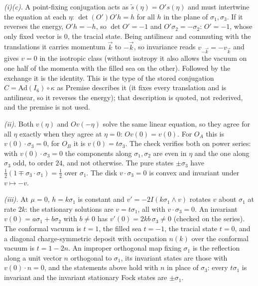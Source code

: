 \emph{(i)(c).} A point-fixing conjugation acts as $\tilde s(\eta) = O's(\eta)$ and must intertwine the equation at each $\eta$: $\det(O')O'h = h$ for all $h$ in the plane of $\sigma_{1}, \sigma_{3}$. If it reverses the energy, $O'h = -h$, so $\det O' = -1$ and $O'\sigma_{2} = -\sigma_{2}$: $O' = -1$, whose only fixed vector is $0$, the tracial state. Being antilinear and commuting with the translations it carries momentum $\vec k$ to $-\vec k$, so invariance reads $v_{-\vec k} = -v_{\vec k}$ and gives $v = 0$ in the isotropic class (without isotropy it also allows the vacuum on one half of the momenta with the filled sea on the other). Followed by the exchange it is the identity. This is the type of the stored conjugation $C = \mathrm{Ad}(I_{6})\circ\kappa$ as Premise  describes it (it fixes every translation and is antilinear, so it reverses the energy); that description is quoted, not rederived, and the premise is not used.

\emph{(ii).} Both $v(\eta)$ and $Ov(-\eta)$ solve the same linear equation, so they agree for all $\eta$ exactly when they agree at $\eta = 0$: $Ov(0) = v(0)$. For $O_{A}$ this is $v(0)\cdot\sigma_{3} = 0$, for $O_{B}$ it is $v(0) = t\sigma_{3}$. The check verifies both on power series: with $v(0)\cdot\sigma_{3} = 0$ the components along $\sigma_{1}, \sigma_{2}$ are even in $\eta$ and the one along $\sigma_{3}$ odd, to order $24$, and not otherwise. The pure states $\pm\sigma_{3}$ have $\tfrac12(1 \mp \sigma_{3}\cdot\sigma_{1}) = \tfrac12$ over $\sigma_{1}$. The disk $v\cdot\sigma_{3} = 0$ is convex and invariant under $v \mapsto -v$.

\emph{(iii).} At $\mu = 0$, $h = k\sigma_{1}$ is constant and $v' = -2I(k\sigma_{1}\wedge v)$ rotates $v$ about $\sigma_{1}$ at rate $2k$: the stationary solutions are $v = t\sigma_{1}$, all with $v\cdot\sigma_{3} = 0$. An invariant $v(0) = a\sigma_{1} + b\sigma_{2}$ with $b \ne 0$ has $v'(0) = 2kb\,\sigma_{3} \ne 0$ (checked on the series). The conformal vacuum is $t = 1$, the filled sea $t = -1$, the tracial state $t = 0$, and a diagonal charge-symmetric deposit with occupation $n(k)$ over the conformal vacuum is $t = 1 - 2n$. An improper orthogonal map fixing $\sigma_{1}$ is the reflection along a unit vector $n$ orthogonal to $\sigma_{1}$, its invariant states are those with $v(0)\cdot n = 0$, and the statements above hold with $n$ in place of $\sigma_{3}$: every $t\sigma_{1}$ is invariant and the invariant stationary Fock states are $\pm\sigma_{1}$.

